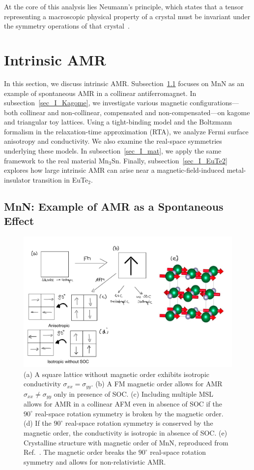 \documentclass[prb,showpacs,amsmath,amssymb,superscriptaddress,twocolumn,floatfix]{revtex4-1}
\begin{document}
At the core of this analysis lies Neumann’s principle, which states that a tensor representing a macroscopic physical property of a crystal must be invariant under the symmetry operations of that crystal~\cite{Ritzinger:2021}.


\section{Intrinsic AMR}
\label{sec_intrinsic}

In this section, we discuss intrinsic AMR. Subsection~\ref{sec_I_MnN} focuses on MnN as an example of spontaneous AMR in a collinear antiferromagnet. In subsection~\ref{sec_I_Kagome}, we investigate various magnetic configurations—both collinear and non-collinear, compensated and non-compensated—on kagome and triangular toy lattices. Using a tight-binding model and the Boltzmann formalism in the relaxation-time approximation (RTA), we analyze Fermi surface anisotropy and conductivity. We also examine the real-space symmetries underlying these models. In subsection~\ref{sec_I_mat}, we apply the same framework to the real material Mn$_3$Sn. Finally, subsection~\ref{sec_I_EuTe2} explores how large intrinsic AMR can arise near a magnetic-field-induced metal-insulator transition in EuTe$_2$.

\subsection{MnN: Example of AMR as a Spontaneous Effect}
\label{sec_I_MnN}

\begin{figure}
	\centering
	\includegraphics[width=1\linewidth]{img/MnN_sketch}
	\caption{(a) A square lattice without magnetic order exhibits isotropic conductivity $\sigma_{xx} = \sigma_{yy}$. (b) A FM magnetic order allows for AMR $\sigma_{xx} \neq \sigma_{yy}$ only in presence of SOC. (c) Including multiple MSL allows for AMR in a collinear AFM even in absence of SOC if the $90^\circ$ real-space rotation symmetry is broken by the magnetic order. (d) If the $90^\circ$ real-space rotation symmetry is conserved by the magnetic order, the conductivity is isotropic in absence of SOC. (e) Crystalline structure with magnetic order of MnN, reproduced from Ref.~\cite{Dunz:2020}. The magnetic order breaks the $90^\circ$ real-space rotation symmetry and allows for non-relativistic AMR.}
	\label{fig:mnnsketch}
\end{figure}
\end{document}
